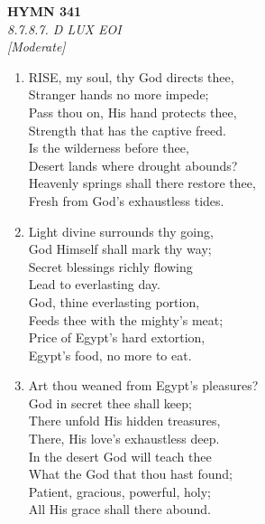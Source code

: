 \documentclass[11pt,a4paper]{article}
\begin{document}
\newpage
\begin{center}
    {\Large \textbf{HYMN 341}}
    \\
    \textit{8.7.8.7. D LUX EOI}
    \\
    \textit{\small [Moderate]}
\end{center}
\vspace{1em}

\begin{enumerate}
    \item RISE, my soul, thy God directs thee, \\
        Stranger hands no more impede; \\
        Pass thou on, His hand protects thee, \\
        Strength that has the captive freed. \\
        Is the wilderness before thee, \\
        Desert lands where drought abounds? \\
        Heavenly springs shall there restore thee, \\
        Fresh from God's exhaustless tides.

    \item Light divine surrounds thy going, \\
        God Himself shall mark thy way; \\
        Secret blessings richly flowing \\
        Lead to everlasting day. \\
        God, thine everlasting portion, \\
        Feeds thee with the mighty's meat; \\
        Price of Egypt's hard extortion, \\
        Egypt's food, no more to eat.

    \item Art thou weaned from Egypt's pleasures? \\
        God in secret thee shall keep; \\
        There unfold His hidden treasures, \\
        There, His love's exhaustless deep. \\
        In the desert God will teach thee \\
        What the God that thou hast found; \\
        Patient, gracious, powerful, holy; \\
        All His grace shall there abound.


\end{enumerate}
\end{document}
